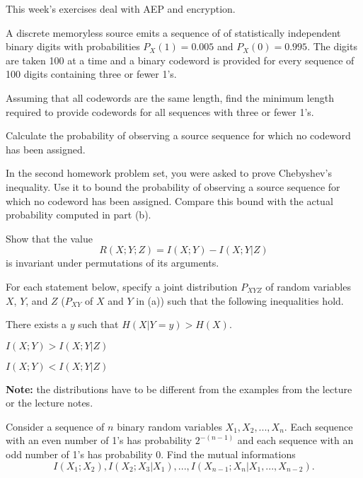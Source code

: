 \documentclass[a4paper,10pt,landscape,twocolumn]{scrartcl}
\begin{document}
\practiceproblems

{\sffamily\noindent
This week's exercises deal with AEP and encryption.  \practiceinstructions
}

\begin{exercise}
A discrete memoryless source emits a sequence of of statistically independent binary digits with probabilities $P_X(1) = 0.005$ and $P_X(0) = 0.995$. The digits are taken 100 at a time and a binary codeword is provided for every sequence of 100 digits containing three or fewer 1's.
	\begin{subex}
	Assuming that all codewords are the same length, find the minimum length required to
provide codewords for all sequences with three or fewer 1's.
	\end{subex}
	\begin{subex}
	Calculate the probability of observing a source sequence for which no codeword has
been assigned.
	\end{subex}
	\begin{subex}
	In the second homework problem set, you were asked to prove Chebyshev's inequality.
	Use it to bound the probability of observing a source sequence for
which no codeword has been assigned. Compare this bound with the actual probability computed
in part (b).
	\end{subex}
\end{exercise}



\begin{exercise}
Show that the value
\[
R(X;Y;Z) = I(X;Y) - I(X;Y|Z)
\]
is invariant under permutations of its arguments.
\end{exercise}

\begin{exercise}[]
For each statement below, specify a joint distribution $P_{XYZ}$ of random variables $X$, $Y$, and $Z$ ($P_{XY}$ of $X$ and $Y$ in (a)) such that the following inequalities hold.
\begin{subex}
There exists a $y$ such that $H(X|Y=y) > H(X)$.
\end{subex}
\begin{subex}
$I(X;Y) > I(X;Y|Z)$
\end{subex}
\begin{subex}
$I(X;Y) < I(X;Y|Z)$
\end{subex}
\textbf{Note:} the distributions have to be different from the examples from the lecture or the lecture notes.
\end{exercise}

\begin{exercise}
Consider a sequence of $n$ binary random variables $X_1, X_2, ..., X_n$.
Each sequence with an even number of 1's has probability $2^{-(n-1)}$ and each sequence with an odd number
of 1's has probability 0. Find the mutual informations
\[
I(X_1;X_2), I(X_2;X_3|X_1), ..., I(X_{n-1};X_n|X_1, ..., X_{n-2}).
\]
\end{exercise}
\vspace{-0.5cm}
\end{document}
